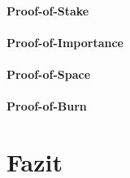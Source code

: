 \documentclass[12pt]{article}
\begin{document}
\subsection{Proof-of-Stake}


\subsection{Proof-of-Importance}


\subsection{Proof-of-Space}


\subsection{Proof-of-Burn}


\part{Fazit}


\clearpage
\frontmatter%
\renewcommand{\plaintitle}{Literaturverzeichnis}
\setcounter{page}{5}
\printMyBibliography
\end{document}
